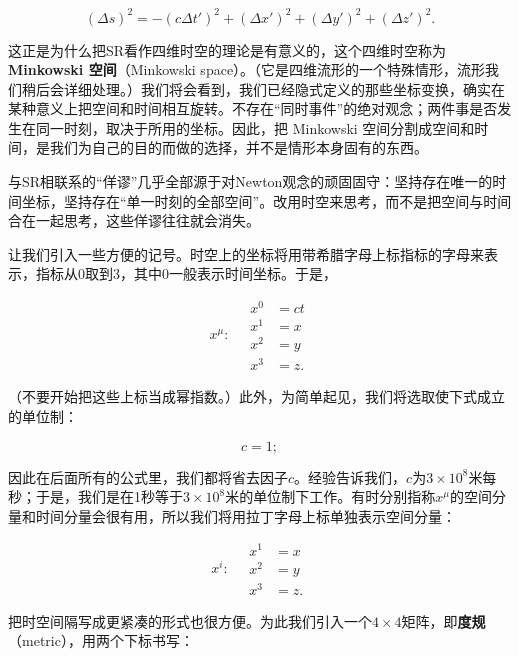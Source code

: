 \begin{equation*}
(\Delta s)^2 = -(c\Delta t')^2 + (\Delta x')^2 + (\Delta y')^2 + (\Delta z')^2.
\tag{1.11}
\end{equation*}

这正是为什么把SR看作四维时空的理论是有意义的，这个四维时空称为\textbf{Minkowski 空间}（Minkowski space）。（它是四维流形的一个特殊情形，流形我们稍后会详细处理。）我们将会看到，我们已经隐式定义的那些坐标变换，确实在某种意义上把空间和时间相互旋转。不存在“同时事件”的绝对观念；两件事是否发生在同一时刻，取决于所用的坐标。因此，把 Minkowski 空间分割成空间和时间，是我们为自己的目的而做的选择，并不是情形本身固有的东西。

与SR相联系的“佯谬”几乎全部源于对Newton观念的顽固固守：坚持存在唯一的时间坐标，坚持存在“单一时刻的全部空间”。改用时空来思考，而不是把空间与时间合在一起思考，这些佯谬往往就会消失。

让我们引入一些方便的记号。时空上的坐标将用带希腊字母上标指标的字母来表示，指标从0取到3，其中0一般表示时间坐标。于是，

\begin{equation*}
x^{\mu}:\quad
\begin{aligned}
x^0 &= ct \\
x^1 &= x \\
x^2 &= y \\
x^3 &= z.
\end{aligned}
\tag{1.12}
\end{equation*}

（不要开始把这些上标当成幂指数。）此外，为简单起见，我们将选取使下式成立的单位制：

\begin{equation*}
c = 1;
\tag{1.13}
\end{equation*}

因此在后面所有的公式里，我们都将省去因子$c$。经验告诉我们，$c$为$3\times10^8$米每秒；于是，我们是在1秒等于$3\times10^8$米的单位制下工作。有时分别指称$x^\mu$的空间分量和时间分量会很有用，所以我们将用拉丁字母上标单独表示空间分量：

\begin{equation*}
x^{i}:\quad
\begin{aligned}
x^1 &= x \\
x^2 &= y \\
x^3 &= z.
\end{aligned}
\tag{1.14}
\end{equation*}

把时空间隔写成更紧凑的形式也很方便。为此我们引入一个$4\times4$矩阵，即\textbf{度规}（metric），用两个下标书写：

